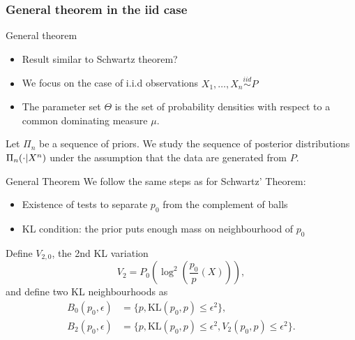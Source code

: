 \subsubsection[iid case]{General theorem in the iid case}



\begin{frame}{General theorem}
\begin{itemize}[<+->]
\item Result similar to Schwartz theorem? 
\item We focus on the case of i.i.d observations $X_1, \dots, X_n \overset{iid}{\sim} P$ 
\item The parameter set $\Theta$ is the set of probability densities with respect to a common dominating measure $\mu$. 
\end{itemize}
\pause 

Let $\Pi_n$ be a sequence of priors. We study the sequence of posterior distributions $\Pi_n(\cdot|X^n)$ under the assumption that the data are generated from $P$. 

\end{frame}


\begin{frame}{General Theorem}
We follow the same steps as for Schwartz' Theorem: 
\begin{itemize}
\item Existence of tests to separate $p_0$ from the complement of balls
\item KL condition: the prior puts enough mass on neighbourhood of $p_0$
\end{itemize}
Define $V_{2,0}$, the 2nd KL variation
$$
V_{2} = P_0 \left( \log^2\left(\frac{p_0}{p}(X) \right)\right),
$$ 
and define two KL neighbourhoods as
\begin{align*}
B_0(p_0,\epsilon) &= \{p, \text{KL}(p_0,p) \leq \epsilon^2\},\\
B_2(p_0,\epsilon) &= \{p, \text{KL}(p_0,p) \leq \epsilon^2, V_{2}(p_0,p) \leq \epsilon^2\}.
\end{align*}

\end{frame}

